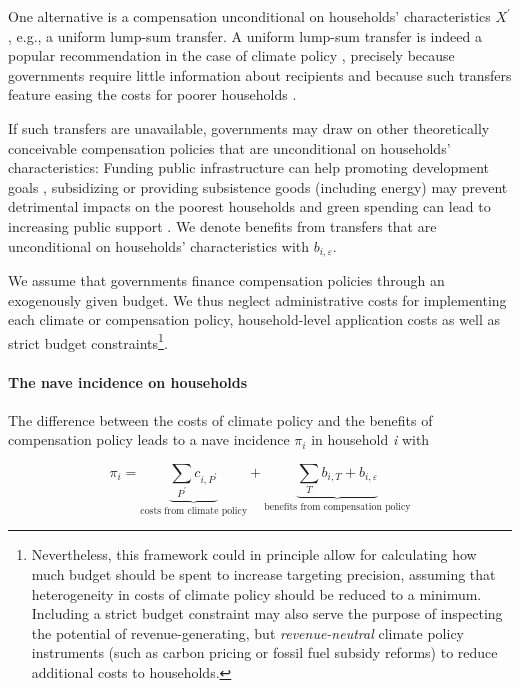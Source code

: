\documentclass[12pt, a4paper]{article}
\begin{document}
One alternative is a compensation unconditional on households' characteristics $X^{\prime}$, e.g., a uniform lump-sum transfer. A uniform lump-sum transfer is indeed a popular recommendation in the case of climate policy \autocite{Stiglitz.2017,Baranzini.2000,Metcalf.2009,Sager.2023}, precisely because governments require little information about recipients and because such transfers feature easing the costs for poorer households \autocite{Budolfson.2021,vanderPloeg.2022}. 

If such transfers are unavailable, governments may draw on other theoretically conceivable compensation policies that are unconditional on households' characteristics: Funding public infrastructure can help promoting development goals \autocite{Franks.2018,Jakob.2016}, subsidizing or providing subsistence goods (including energy) may prevent detrimental impacts on the poorest households \autocite{Greve.2022,Schaffitzel.2019} and green spending can lead to increasing public support \autocite{Sommer.2022,Kotchen.2017,Dechezlepretre.2022}. We denote benefits from transfers that are unconditional on households' characteristics with $b_{i,\varepsilon}$.

We assume that governments finance compensation policies through an exogenously given budget. We thus neglect administrative costs for implementing each climate or compensation policy, household-level application costs as well as strict budget constraints\footnote{Nevertheless, this framework could in principle allow for calculating how much budget should be spent to increase targeting precision, assuming that heterogeneity in costs of climate policy should be reduced to a minimum. Including a strict budget constraint may also serve the purpose of inspecting the potential of revenue-generating, but \textit{revenue-neutral} climate policy instruments (such as carbon pricing or fossil fuel subsidy reforms) to reduce additional costs to households.}. 

\paragraph{The nave incidence on households}
The difference between the costs of climate policy and the benefits of compensation policy leads to a nave incidence $\pi_{i}$ in household \textit{i} with

\begin{equation} \label{eq:pi}
    \pi_{i} = \underbrace{\sum_{P^{\prime}} c_{i,P^{\prime}}}_{\text{costs from climate policy}} + \underbrace{\sum_{T} b_{i,T} + b_{i,\varepsilon}}_{\text{benefits from compensation policy}}
\end{equation}
\end{document}
